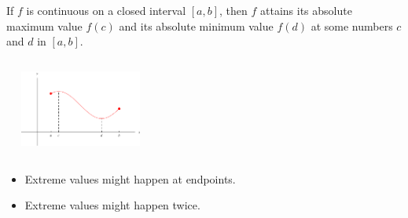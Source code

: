 \begin{frame}[t]
\begin{theorem}
If $f$ is continuous on a closed interval $[a,b]$, then $f$ attains its absolute maximum value $f(c)$ and its absolute minimum value $f(d)$ at some numbers $c$ and $d$ in $[a,b]$.
\end{theorem}
\begin{columns}[c]
\ %
\ \includegraphics[width=4cm]{maxima-minima/pictures/04-01-evta.pdf}%
\ %
\end{columns}
\begin{itemize}
\item<2-| alert@2>  Extreme values might happen at endpoints.
\item<3-| alert@3>  Extreme values might happen twice.
\end{itemize}
\end{frame}
